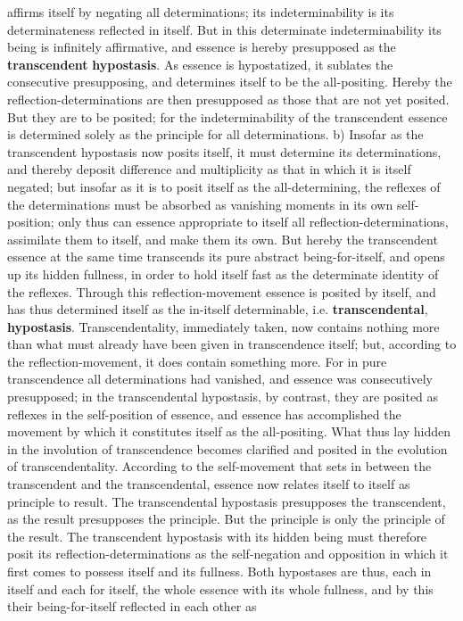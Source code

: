 \documentclass[12pt,a4paper,openany]{book}
\newcommand{\opage}[1]{\marginnote{\footnotesize\textit{[#1]}}}
\begin{document}
affirms itself by negating all determinations; its indeterminability is its determinateness reflected in itself. But in this determinate indeterminability its being is infinitely affirmative, and essence is hereby presupposed as the \textbf{transcendent} \textbf{hypostasis}. As essence is hypostatized, it sublates the consecutive presupposing, and determines itself to be the all-positing. Hereby the reflection-determinations are then presupposed as those that are not yet posited. But they are to be posited; for the indeterminability of the transcendent essence is determined solely as the principle for all determinations.
b) Insofar as the transcendent hypostasis now posits itself, it must determine its determinations, and thereby deposit difference and multiplicity as that in which it is itself negated; but insofar as it is to posit itself as the all-determining, the reflexes of the determinations must be absorbed as vanishing moments in its own self-position; only thus can essence appropriate to itself all
\setcounter{footnote}{0}%
\opage{116}reflection-determinations, assimilate them to itself, and make them its own. But hereby the transcendent essence at the same time transcends its pure abstract being-for-itself, and opens up its hidden fullness, in order to hold itself fast as the determinate identity of the reflexes. Through this reflection-movement essence is posited by itself, and has thus determined itself as the in-itself determinable, i.e. \textbf{transcendental}, \textbf{hypostasis}. Transcendentality, immediately taken, now contains nothing more than what must already have been given in transcendence itself; but, according to the reflection-movement, it does contain something more. For in pure transcendence all determinations had vanished, and essence was consecutively presupposed; in the transcendental hypostasis, by contrast, they are posited as reflexes in the self-position of essence, and essence has accomplished the movement by which it constitutes itself as the all-positing. What thus lay hidden in the involution of transcendence becomes clarified and posited in the evolution of transcendentality. According to the self-movement that sets in between the transcendent and the transcendental, essence now relates itself to itself as principle to result. The transcendental hypostasis presupposes the transcendent, as the result presupposes the principle. But the principle is only the principle of the result. The transcendent hypostasis with its hidden being must therefore posit its reflection-determinations as the self-negation and opposition in which it first comes to possess itself and its fullness. Both hypostases are thus, each in itself and each for itself, the whole essence with its whole fullness, and by this their being-for-itself reflected in each other as
\end{document}

